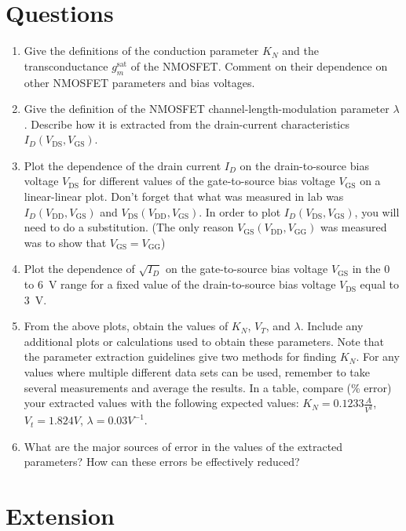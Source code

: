 \documentclass[12pt]{article}
\begin{document}
\section{Questions}
\begin{enumerate}
\item Give the definitions of the conduction parameter $K_N$ and the transconductance $g_m^\mathrm{sat}$ of the NMOSFET. Comment on their dependence on other NMOSFET parameters and bias voltages.


\item Give the definition of the NMOSFET channel-length-modulation parameter $\lambda$. Describe how it is extracted from the drain-current characteristics $I_D(V_{\mathrm{DS}}, V_{\mathrm{GS}})$.


\item Plot the dependence of the drain current $I_{D}$ on the drain-to-source bias voltage $V_{\mathrm{DS}}$ for different values of the gate-to-source bias voltage $V_{\mathrm{GS}}$ on a linear-linear plot. Don't forget that what was measured in lab was $I_D(V_{\mathrm{DD}}, V_{\mathrm{GS}})$ and $V_{\mathrm{DS}}(V_{\mathrm{DD}}, V_{\mathrm{GS}})$. In order to plot $I_D(V_{\mathrm{DS}}, V_{\mathrm{GS}})$, you will need to do a substitution. (The only reason $V_{\mathrm{GS}}(V_{\mathrm{DD}}, V_{\mathrm{GG}})$ was measured was to show that $V_{\mathrm{GS}} = V_{\mathrm{GG}}$)


\item Plot the dependence of $\sqrt{I_D}$ on the gate-to-source bias voltage $ V_{\mathrm{GS}}$ in the 0 to \SI{6}{\volt} range for a fixed value of the drain-to-source bias voltage $V_{\mathrm{DS}}$ equal to \SI{3}{\volt}.


\item From the above plots, obtain the values of $K_N$, $V_T$, and $\lambda$. Include any additional plots or calculations used to obtain these parameters. Note that the parameter extraction guidelines give two methods for finding $K_N$. For any values where multiple different data sets can be used, remember to take several measurements and average the results. In a table, compare (\% error) your extracted values with the following expected values: $K_N=0.1233\frac{A}{V^2}$, $V_t=1.824V$, $\lambda=0.03V^{-1}$.


\item What are the major sources of error in the values of the extracted parameters? How can these errors be effectively reduced?
\end{enumerate}

\section{Extension}
\end{document}
